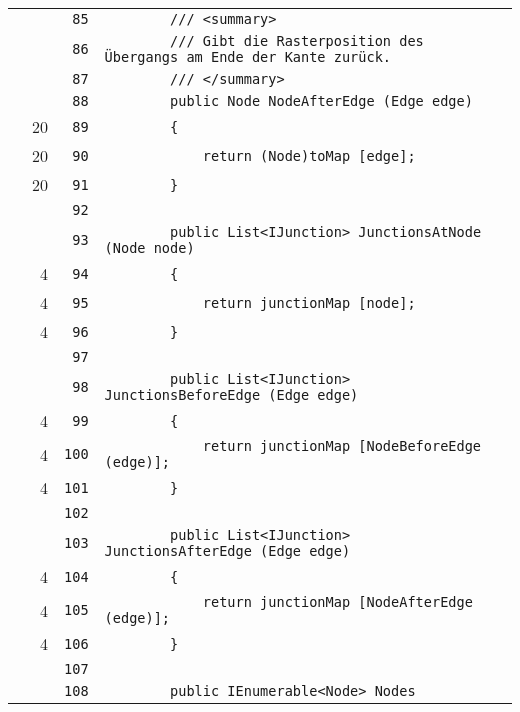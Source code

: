 \documentclass[a4paper,10pt]{article}
\begin{document}
\begin{longtable}[l]{lrrl}
\cellcolor{gray} &  & \verb~85~ & \verb~        /// <summary>~\\
\cellcolor{gray} &  & \verb~86~ & \verb~        /// Gibt die Rasterposition des Übergangs am Ende der Kante zurück.~\\
\cellcolor{gray} &  & \verb~87~ & \verb~        /// </summary>~\\
\cellcolor{gray} &  & \verb~88~ & \verb~        public Node NodeAfterEdge (Edge edge)~\\
\cellcolor{green} & 20 & \verb~89~ & \verb~        {~\\
\cellcolor{green} & 20 & \verb~90~ & \verb~            return (Node)toMap [edge];~\\
\cellcolor{green} & 20 & \verb~91~ & \verb~        }~\\
\cellcolor{gray} &  & \verb~92~ & \verb~~\\
\cellcolor{gray} &  & \verb~93~ & \verb~        public List<IJunction> JunctionsAtNode (Node node)~\\
\cellcolor{green} & 4 & \verb~94~ & \verb~        {~\\
\cellcolor{green} & 4 & \verb~95~ & \verb~            return junctionMap [node];~\\
\cellcolor{green} & 4 & \verb~96~ & \verb~        }~\\
\cellcolor{gray} &  & \verb~97~ & \verb~~\\
\cellcolor{gray} &  & \verb~98~ & \verb~        public List<IJunction> JunctionsBeforeEdge (Edge edge)~\\
\cellcolor{green} & 4 & \verb~99~ & \verb~        {~\\
\cellcolor{green} & 4 & \verb~100~ & \verb~            return junctionMap [NodeBeforeEdge (edge)];~\\
\cellcolor{green} & 4 & \verb~101~ & \verb~        }~\\
\cellcolor{gray} &  & \verb~102~ & \verb~~\\
\cellcolor{gray} &  & \verb~103~ & \verb~        public List<IJunction> JunctionsAfterEdge (Edge edge)~\\
\cellcolor{green} & 4 & \verb~104~ & \verb~        {~\\
\cellcolor{green} & 4 & \verb~105~ & \verb~            return junctionMap [NodeAfterEdge (edge)];~\\
\cellcolor{green} & 4 & \verb~106~ & \verb~        }~\\
\cellcolor{gray} &  & \verb~107~ & \verb~~\\
\cellcolor{gray} &  & \verb~108~ & \verb~        public IEnumerable<Node> Nodes~\\

\end{longtable}
\end{document}
